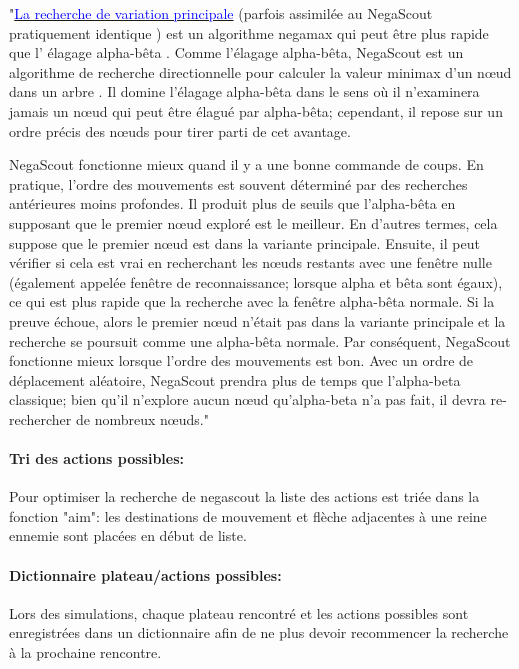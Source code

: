 \documentclass[utf8]{article}
\begin{document}
    "\href{https://en.wikipedia.org/wiki/Principal_variation_search}{\textcolor{blue}{La recherche de variation principale}} (parfois assimilée au NegaScout pratiquement identique ) est un algorithme negamax qui peut être plus rapide que l' élagage alpha-bêta . Comme l'élagage alpha-bêta, NegaScout est un algorithme de recherche directionnelle pour calculer la valeur minimax d'un nœud dans un arbre . Il domine l'élagage alpha-bêta dans le sens où il n'examinera jamais un nœud qui peut être élagué par alpha-bêta; cependant, il repose sur un ordre précis des nœuds pour tirer parti de cet avantage.

    NegaScout fonctionne mieux quand il y a une bonne commande de coups. En pratique, l'ordre des mouvements est souvent déterminé par des recherches antérieures moins profondes. Il produit plus de seuils que l'alpha-bêta en supposant que le premier nœud exploré est le meilleur. En d'autres termes, cela suppose que le premier nœud est dans la variante principale. Ensuite, il peut vérifier si cela est vrai en recherchant les nœuds restants avec une fenêtre nulle (également appelée fenêtre de reconnaissance; lorsque alpha et bêta sont égaux), ce qui est plus rapide que la recherche avec la fenêtre alpha-bêta normale. Si la preuve échoue, alors le premier nœud n'était pas dans la variante principale et la recherche se poursuit comme une alpha-bêta normale. Par conséquent, NegaScout fonctionne mieux lorsque l'ordre des mouvements est bon. Avec un ordre de déplacement aléatoire, NegaScout prendra plus de temps que l'alpha-beta classique; bien qu'il n'explore aucun nœud  qu'alpha-beta n'a pas fait, il devra re-rechercher de nombreux nœuds."

\paragraph{Tri des actions possibles:}
    Pour optimiser la recherche de negascout la liste des actions est triée dans la fonction "aim":
    les destinations de mouvement et flèche adjacentes à une reine ennemie sont placées en début de liste.

\paragraph{Dictionnaire plateau/actions possibles:}
     Lors des simulations, chaque plateau rencontré et les actions possibles sont enregistrées dans un dictionnaire afin de ne plus devoir recommencer la recherche à la prochaine rencontre.
\end{document}
